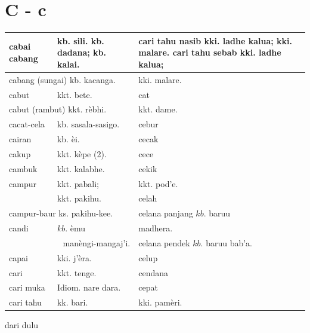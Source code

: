 \documentclass[10pt]{article}
\begin{document}
\section*{C - c}
\begin{center}
\begin{tabular}{|l|l|l|}
\hline
cabai cabang & kb. sili. kb. dadana; kb. kalai. & cari tahu nasib kki. ladhe kalua; kki. malare. cari tahu sebab kki. ladhe kalua; \\
\hline
\multicolumn{2}{|l|}{cabang (sungai) kb. kacanga.} & kki. malare. \\
\hline
cabut & kkt. bete. & cat \\
\hline
\multicolumn{2}{|l|}{cabut (rambut) kkt. rèbhi.} & kkt. dame. \\
\hline
cacat-cela & kb. sasala-sasigo. & cebur \\
\hline
cairan & kb. èi. & cecak \\
\hline
cakup & kkt. kèpe (2). & cece \\
\hline
cambuk & kkt. kalabhe. & cekik \\
\hline
campur & kkt. pabali; & kkt. pod'e. \\
\hline
 & kkt. pakihu. & celah \\
\hline
\multicolumn{2}{|l|}{campur-baur ks. pakihu-kee.} & celana panjang \(k b\). baruu \\
\hline
candi & \(k b\). èmu & madhera. \\
\hline
\multicolumn{2}{|r|}{manèngi-mangaj'i.} & celana pendek \(k b\). baruu bab'a. \\
\hline
capai & kki. j'èra. & celup \\
\hline
cari & kkt. tenge. & cendana \\
\hline
cari muka & Idiom. nare dara. & cepat \\
\hline
cari tahu & kk. bari. & kki. pamèri. \\
\hline
\end{tabular}
\end{center}

dari dulu
\end{document}

